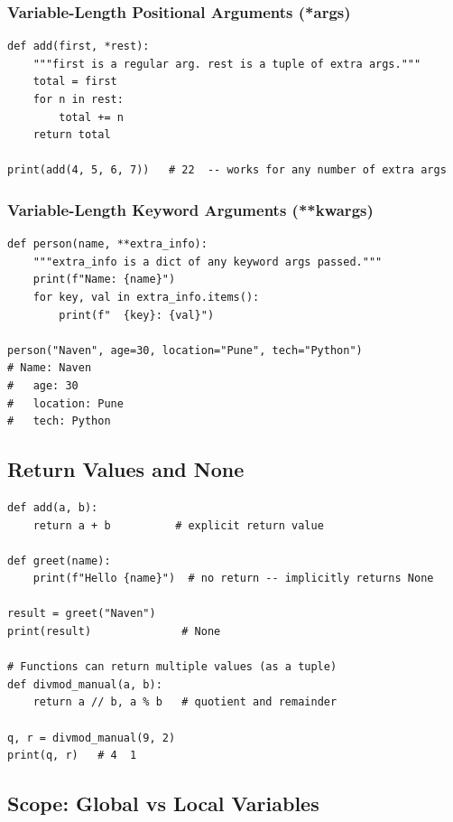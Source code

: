 \documentclass[12pt,a4paper]{article}
\begin{document}
\subsubsection{Variable-Length Positional Arguments (*args)}

\begin{lstlisting}
def add(first, *rest):
    """first is a regular arg. rest is a tuple of extra args."""
    total = first
    for n in rest:
        total += n
    return total

print(add(4, 5, 6, 7))   # 22  -- works for any number of extra args
\end{lstlisting}

\subsubsection{Variable-Length Keyword Arguments (**kwargs)}

\begin{lstlisting}
def person(name, **extra_info):
    """extra_info is a dict of any keyword args passed."""
    print(f"Name: {name}")
    for key, val in extra_info.items():
        print(f"  {key}: {val}")

person("Naven", age=30, location="Pune", tech="Python")
# Name: Naven
#   age: 30
#   location: Pune
#   tech: Python
\end{lstlisting}

\subsection{Return Values and None}

\begin{lstlisting}
def add(a, b):
    return a + b          # explicit return value

def greet(name):
    print(f"Hello {name}")  # no return -- implicitly returns None

result = greet("Naven")
print(result)              # None

# Functions can return multiple values (as a tuple)
def divmod_manual(a, b):
    return a // b, a % b   # quotient and remainder

q, r = divmod_manual(9, 2)
print(q, r)   # 4  1
\end{lstlisting}

\subsection{Scope: Global vs Local Variables}
\end{document}
